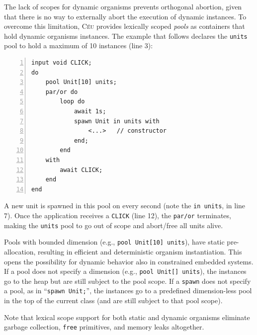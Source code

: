 \documentclass{acm_proc_article-sp}
\newcommand{\CEU}{\textsc{C\'{e}u}\xspace}
\newcommand{\code}[1] {{\small{\texttt{#1}}}}
\newcommand{\1}{\;}
\newcommand{\2}{\;\;}
\newcommand{\3}{\;\;\;}
\newcommand{\5}{\;\;\;\;\;}
\begin{document}
The lack of scopes for dynamic organisms prevents orthogonal abortion, given 
that there is no way to externally abort the execution of dynamic instances.
%
To overcome this limitation, \CEU provides lexically scoped \emph{pools} as 
containers that hold dynamic organisms instances.
%
The example that follows declares the \code{units} pool to hold a maximum of 10 
instances (line 3):

\begin{lstlisting}[numbers=left,xleftmargin=3em]
input void CLICK;
do
    pool Unit[10] units;
    par/or do
        loop do
            await 1s;
            spawn Unit in units with
                <...>   // constructor
            end;
        end
    with
        await CLICK;
    end
end
\end{lstlisting}

A new unit is spawned in this pool on every second (note the \code{in units}, 
in line 7).
Once the application receives a \code{CLICK} (line 12), the \code{par/or} 
terminates, making the \code{units} pool to go out of scope and abort/free all 
units alive.

Pools with bounded dimension (e.g., \code{pool Unit[10] units}), have static 
pre-allocation, resulting in efficient and deterministic organism 
instantiation.
This opens the possibility for dynamic behavior also in constrained embedded 
systems.
%
If a pool does not specify a dimension (e.g., \code{pool Unit[] units}), the 
instances go to the heap but are still subject to the pool scope.
%
If a \code{spawn} does not specify a pool, as in ``\code{spawn Unit;}'', the 
instances go to a predefined dimension-less pool in the top of the current 
class (and are still subject to that pool scope).

Note that lexical scope support for both static and dynamic organisms eliminate 
garbage collection, \code{free} primitives, and memory leaks altogether.

\end{document}

